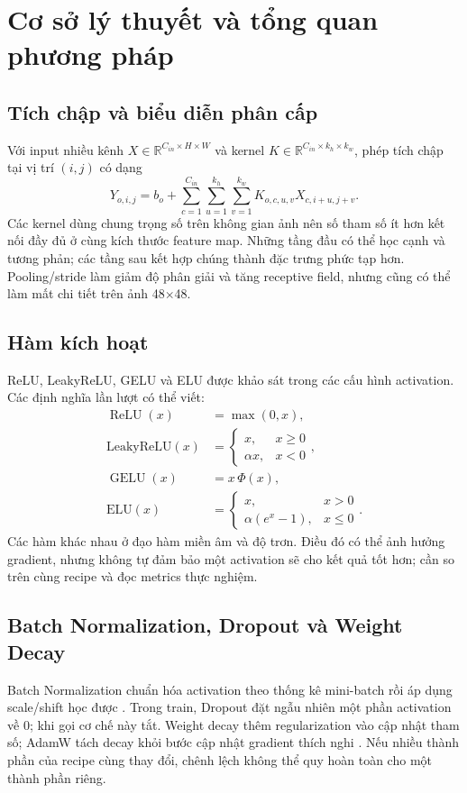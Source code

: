 \chapter{Cơ sở lý thuyết và tổng quan phương pháp}

\section{Tích chập và biểu diễn phân cấp}
Với input nhiều kênh $X\in\mathbb{R}^{C_{in}\times H\times W}$ và kernel $K\in\mathbb{R}^{C_{in}\times k_h\times k_w}$, phép tích chập tại vị trí $(i,j)$ có dạng
\begin{equation}
Y_{o,i,j}=b_o+\sum_{c=1}^{C_{in}}\sum_{u=1}^{k_h}\sum_{v=1}^{k_w}K_{o,c,u,v}X_{c,i+u,j+v}.
\end{equation}
Các kernel dùng chung trọng số trên không gian ảnh nên số tham số ít hơn kết nối đầy đủ ở cùng kích thước feature map. Những tầng đầu có thể học cạnh và tương phản; các tầng sau kết hợp chúng thành đặc trưng phức tạp hơn. Pooling/stride làm giảm độ phân giải và tăng receptive field, nhưng cũng có thể làm mất chi tiết trên ảnh 48\ensuremath{\times}48.

\section{Hàm kích hoạt}
ReLU, LeakyReLU, GELU và ELU được khảo sát trong các cấu hình activation. Các định nghĩa lần lượt có thể viết:
\begin{align}
\operatorname{ReLU}(x) &= \max(0, x),\\
\text{LeakyReLU}(x) &= \begin{cases} x, & x \ge 0 \\ \alpha x, & x < 0 \end{cases},\\
\operatorname{GELU}(x) &= x\,\Phi(x),\\
\text{ELU}(x) &= \begin{cases} x, & x > 0 \\ \alpha(e^x - 1), & x \le 0 \end{cases}.
\end{align}
Các hàm khác nhau ở đạo hàm miền âm và độ trơn. Điều đó có thể ảnh hưởng gradient, nhưng không tự đảm bảo một activation sẽ cho kết quả tốt hơn; cần so trên cùng recipe và đọc metrics thực nghiệm.

\section{Batch Normalization, Dropout và Weight Decay}
Batch Normalization chuẩn hóa activation theo thống kê mini-batch rồi áp dụng scale/shift học được \citep{ioffe2015batchnorm}. Trong train, Dropout đặt ngẫu nhiên một phần activation về 0; khi gọi  cơ chế này tắt. Weight decay thêm regularization vào cập nhật tham số; AdamW tách decay khỏi bước cập nhật gradient thích nghi \citep{loshchilov2019adamw}. Nếu nhiều thành phần của recipe cùng thay đổi, chênh lệch không thể quy hoàn toàn cho một thành phần riêng.

